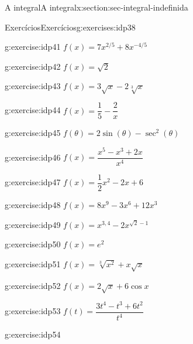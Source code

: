 \documentclass[oneside,10pt,]{article}
\numberwithin{equation}{section}
\begin{document}
\begin{sectionptx}{A integral}{}{A integral}{}{}{x:section:sec-integral-indefinida}
\begin{exercises-subsection}{Exercícios}{}{Exercícios}{}{}{g:exercises:idp38}
\begin{exercisegroupcol}{2}
\begin{divisionexerciseegcol}{3}{}{}{g:exercise:idp41}%
\(f(x) = 7x^{2/5} + 8 x^{-4/5}\)\end{divisionexerciseegcol}%
\begin{divisionexerciseegcol}{4}{}{}{g:exercise:idp42}%
\(f(x) = \sqrt{2}\)\end{divisionexerciseegcol}%
\begin{divisionexerciseegcol}{5}{}{}{g:exercise:idp43}%
\(f(x) = 3 \sqrt{x} - 2\sqrt[3]{x} \)\end{divisionexerciseegcol}%
\begin{divisionexerciseegcol}{6}{}{}{g:exercise:idp44}%
\(f(x) = \dfrac{1}{5} - \dfrac{2}{x}\)\end{divisionexerciseegcol}%
\begin{divisionexerciseegcol}{7}{}{}{g:exercise:idp45}%
\(f(\theta) = 2 \sin (\theta) - \sec^2(\theta)\)\end{divisionexerciseegcol}%
\begin{divisionexerciseegcol}{8}{}{}{g:exercise:idp46}%
\(f(x) = \dfrac{x^5 - x^3 + 2x}{x^4}\)\end{divisionexerciseegcol}%
\begin{divisionexerciseegcol}{9}{}{}{g:exercise:idp47}%
\(f(x) = \dfrac{1}{2}x^2 - 2x + 6\)\end{divisionexerciseegcol}%
\begin{divisionexerciseegcol}{10}{}{}{g:exercise:idp48}%
\(f(x) = 8x^9 - 3 x^6 + 12 x^3\)\end{divisionexerciseegcol}%
\begin{divisionexerciseegcol}{11}{}{}{g:exercise:idp49}%
\(f(x) = x^{3,4} - 2x^{\sqrt{2}-1}\)\end{divisionexerciseegcol}%
\begin{divisionexerciseegcol}{12}{}{}{g:exercise:idp50}%
\(f(x) =e^2\)\end{divisionexerciseegcol}%
\begin{divisionexerciseegcol}{13}{}{}{g:exercise:idp51}%
\(f(x) = \sqrt[3]{x^2} + x \sqrt{x}\)\end{divisionexerciseegcol}%
\begin{divisionexerciseegcol}{14}{}{}{g:exercise:idp52}%
\(f(x) = 2\sqrt{x} + 6 \cos x\)\end{divisionexerciseegcol}%
\begin{divisionexerciseegcol}{15}{}{}{g:exercise:idp53}%
\(f(t) = \dfrac{3t^4 - t^3+6t^2}{t^4}\)\end{divisionexerciseegcol}%
\begin{divisionexerciseegcol}{16}{}{}{g:exercise:idp54}%

\end{divisionexerciseegcol}
\end{exercisegroupcol}
\end{exercises-subsection}
\end{sectionptx}
\end{document}
